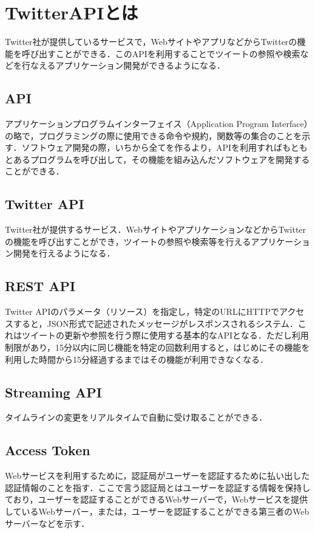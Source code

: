 \section{TwitterAPIとは}
Twitter社が提供しているサービスで，WebサイトやアプリなどからTwitterの機能を呼び出すことができる．このAPIを利用することでツイートの参照や検索などを行なえるアプリケーション開発ができるようになる．

\subsection{API}
アプリケーションプログラムインターフェイス（Application Program Interface）の略で，プログラミングの際に使用できる命令や規約，関数等の集合のことを示す．ソフトウェア開発の際，いちから全てを作るより，APIを利用すればもともとあるプログラムを呼び出して，その機能を組み込んだソフトウェアを開発することができる．

\subsection{Twitter API}
Twitter社が提供するサービス．WebサイトやアプリケーションなどからTwitterの機能を呼び出すことができ，ツイートの参照や検索等を行えるアプリケーション開発を行えるようになる．

\subsection{REST API}
Twitter APIのパラメータ（リソース）を指定し，特定のURLにHTTPでアクセスすると，JSON形式で記述されたメッセージがレスポンスされるシステム．これはツイートの更新や参照を行う際に使用する基本的なAPIとなる．ただし利用制限があり，15分以内に同じ機能を特定の回数利用すると，はじめにその機能を利用した時間から15分経過するまではその機能が利用できなくなる．

\subsection{Streaming API}
タイムラインの変更をリアルタイムで自動に受け取ることができる．

\subsection{Access Token}
Webサービスを利用するために，認証局がユーザーを認証するために払い出した認証情報のことを指す．ここで言う認証局とはユーザーを認証する情報を保持しており，ユーザーを認証することができるWebサーバーで，Webサービスを提供しているWebサーバー，または，ユーザーを認証することができる第三者のWebサーバーなどを示す．


